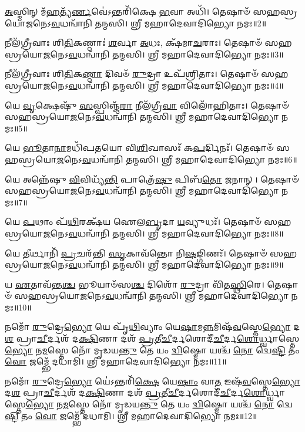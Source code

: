 \-\ul{𑌅}\-𑌸𑍍𑌮𑌿𑌨𑍍 𑌮᳴\-\ul{𑌹}\-𑌤𑍍𑌯᳴\-\ul{𑌰𑍍𑌣}\-𑌵𑍇॑𑌽𑌨𑍍𑌤𑌰𑌿᳴𑌕𑍍𑌷𑍇 \ul{𑌭}\-𑌵𑌾 𑌅𑌧𑌿᳴। 𑌤𑍇𑌷𑌾𑍞᳴ 𑌸𑌹𑌸𑍍𑌰𑌯𑍋\-\ul{𑌜}\-𑌨𑍇\-𑌽\-\ul{𑌵}\-𑌧𑌨𑍍𑌵𑌾᳴𑌨𑌿 𑌤𑌨𑍍𑌮𑌸𑌿। 𑌶𑍍𑌰𑍀 𑌮𑌹𑌾𑌦𑍇𑌵𑌾𑌦𑌿𑌭𑍍𑌯𑍋 𑌨𑌮𑌃॥2॥

𑌨𑍀𑌲᳴𑌗𑍍𑌰𑍀𑌵𑌾𑌃 𑌶𑌿\-\ul{𑌤𑌿}\-𑌕𑌣𑍍𑌠𑌾𑌃॑ \ul{𑌶}\-𑌰𑍍𑌵𑌾 \ul{𑌅}\-𑌧𑌃, 𑌕𑍍𑌷᳴𑌮𑌾\-\ul{𑌚}\-𑌰𑌾𑌃। 𑌤𑍇𑌷𑌾𑍞᳴ 𑌸𑌹𑌸𑍍𑌰𑌯𑍋\-\ul{𑌜}\-𑌨𑍇\-𑌽\-\ul{𑌵}\-𑌧𑌨𑍍𑌵𑌾᳴𑌨𑌿 𑌤𑌨𑍍𑌮𑌸𑌿। 𑌶𑍍𑌰𑍀 𑌮𑌹𑌾𑌦𑍇𑌵𑌾𑌦𑌿𑌭𑍍𑌯𑍋 𑌨𑌮𑌃॥3॥

𑌨𑍀𑌲᳴𑌗𑍍𑌰𑍀𑌵𑌾𑌃 𑌶𑌿\-\ul{𑌤𑌿}\-𑌕\-\ul{𑌣𑍍𑌠𑌾} 𑌦𑌿𑌵𑍞᳴ \ul{𑌰𑍁}\-𑌦𑍍𑌰𑌾 𑌉𑌪᳴𑌶𑍍𑌰𑌿𑌤𑌾𑌃। 𑌤𑍇𑌷𑌾𑍞᳴ 𑌸𑌹𑌸𑍍𑌰𑌯𑍋\-\ul{𑌜}\-𑌨𑍇\-𑌽\-\ul{𑌵}\-𑌧𑌨𑍍𑌵𑌾᳴𑌨𑌿 𑌤𑌨𑍍𑌮𑌸𑌿। 𑌶𑍍𑌰𑍀 𑌮𑌹𑌾𑌦𑍇𑌵𑌾𑌦𑌿𑌭𑍍𑌯𑍋 𑌨𑌮𑌃॥4॥

𑌯𑍇 \ul{𑌵𑍃}\-𑌕𑍍𑌷𑍇𑌷𑍁᳴ \ul{𑌸}\-𑌸𑍍𑌪𑌿𑌞𑍍𑌜᳴\-\ul{𑌰𑌾} 𑌨𑍀𑌲᳴𑌗𑍍𑌰𑍀\-\ul{𑌵𑌾} 𑌵𑌿𑌲𑍋᳴𑌹𑌿𑌤𑌾𑌃। 𑌤𑍇𑌷𑌾𑍞᳴ 𑌸𑌹𑌸𑍍𑌰𑌯𑍋\-\ul{𑌜}\-𑌨𑍇\-𑌽\-\ul{𑌵}\-𑌧𑌨𑍍𑌵𑌾᳴𑌨𑌿 𑌤𑌨𑍍𑌮𑌸𑌿। 𑌶𑍍𑌰𑍀 𑌮𑌹𑌾𑌦𑍇𑌵𑌾𑌦𑌿𑌭𑍍𑌯𑍋 𑌨𑌮𑌃॥5॥

𑌯𑍇 \ul{𑌭𑍂}\-𑌤𑌾\-\ul{𑌨𑌾}\-𑌮𑌧𑌿᳴𑌪𑌤𑌯𑍋 𑌵𑌿\-\ul{𑌶𑌿}\-𑌖𑌾𑌸𑌃᳴ 𑌕\-\ul{𑌪}\-𑌰𑍍𑌦𑌿𑌨𑌃᳴। 𑌤𑍇𑌷𑌾𑍞᳴ 𑌸𑌹𑌸𑍍𑌰𑌯𑍋\-\ul{𑌜}\-𑌨𑍇\-𑌽\-\ul{𑌵}\-𑌧𑌨𑍍𑌵𑌾᳴𑌨𑌿 𑌤𑌨𑍍𑌮𑌸𑌿। 𑌶𑍍𑌰𑍀 𑌮𑌹𑌾𑌦𑍇𑌵𑌾𑌦𑌿𑌭𑍍𑌯𑍋 𑌨𑌮𑌃॥6॥

𑌯𑍇 𑌅𑌨𑍍𑌨𑍇᳴𑌷𑍁 \ul{𑌵𑌿}\-𑌵𑌿𑌧𑍍𑌯᳴\-\ul{𑌨𑍍𑌤𑌿} 𑌪𑌾𑌤𑍍𑌰𑍇᳴\-\ul{𑌷𑍁} 𑌪𑌿𑌬᳴\-\ul{𑌤𑍋} 𑌜𑌨𑌾𑌨𑍍। 𑌤𑍇𑌷𑌾𑍞᳴ 𑌸𑌹𑌸𑍍𑌰𑌯𑍋\-\ul{𑌜}\-𑌨𑍇\-𑌽\-\ul{𑌵}\-𑌧𑌨𑍍𑌵𑌾᳴𑌨𑌿 𑌤𑌨𑍍𑌮𑌸𑌿। 𑌶𑍍𑌰𑍀 𑌮𑌹𑌾𑌦𑍇𑌵𑌾𑌦𑌿𑌭𑍍𑌯𑍋 𑌨𑌮𑌃॥7॥

𑌯𑍇 \ul{𑌪}\-𑌥𑌾𑌂 𑌪᳴\-\ul{𑌥𑌿}\-𑌰𑌕𑍍𑌷᳴𑌯 𑌐𑌲\-\ul{𑌬𑍃}\-𑌦𑌾 \ul{𑌯}\-𑌵𑍍𑌯𑍁𑌧𑌃᳴। 𑌤𑍇𑌷𑌾𑍞᳴ 𑌸𑌹𑌸𑍍𑌰𑌯𑍋\-\ul{𑌜}\-𑌨𑍇\-𑌽\-\ul{𑌵}\-𑌧𑌨𑍍𑌵𑌾᳴𑌨𑌿 𑌤𑌨𑍍𑌮𑌸𑌿। 𑌶𑍍𑌰𑍀 𑌮𑌹𑌾𑌦𑍇𑌵𑌾𑌦𑌿𑌭𑍍𑌯𑍋 𑌨𑌮𑌃॥8॥

𑌯𑍇 \ul{𑌤𑍀}\-𑌰𑍍𑌥𑌾𑌨𑌿᳴ \ul{𑌪𑍍𑌰}\-𑌚𑌰᳴𑌨𑍍𑌤𑌿 \ul{𑌸𑍃}\-𑌕𑌾𑌵᳴𑌨𑍍𑌤𑍋 𑌨𑌿\-\ul{𑌷}\-𑌙𑍍𑌗𑌿𑌣𑌃᳴। 𑌤𑍇𑌷𑌾𑍞᳴ 𑌸𑌹𑌸𑍍𑌰𑌯𑍋\-\ul{𑌜}\-𑌨𑍇\-𑌽\-\ul{𑌵}\-𑌧𑌨𑍍𑌵𑌾᳴𑌨𑌿 𑌤𑌨𑍍𑌮𑌸𑌿। 𑌶𑍍𑌰𑍀 𑌮𑌹𑌾𑌦𑍇𑌵𑌾𑌦𑌿𑌭𑍍𑌯𑍋 𑌨𑌮𑌃॥9॥

𑌯 \ul{𑌏}\-𑌤𑌾𑌵᳴𑌨𑍍𑌤\-\ul{𑌶𑍍𑌚} 𑌭𑍂𑌯𑌾𑍞᳴𑌸\-\ul{𑌶𑍍𑌚} 𑌦𑌿𑌶𑍋᳴ \ul{𑌰𑍁}\-𑌦𑍍𑌰𑌾 𑌵𑌿᳴𑌤\-\ul{𑌸𑍍𑌥𑌿}\-𑌰𑍇। 𑌤𑍇𑌷𑌾𑍞᳴ 𑌸𑌹𑌸𑍍𑌰𑌯𑍋\-\ul{𑌜}\-𑌨𑍇\-𑌽\-\ul{𑌵}\-𑌧𑌨𑍍𑌵𑌾᳴𑌨𑌿 𑌤𑌨𑍍𑌮𑌸𑌿। 𑌶𑍍𑌰𑍀 𑌮𑌹𑌾𑌦𑍇𑌵𑌾𑌦𑌿𑌭𑍍𑌯𑍋 𑌨𑌮𑌃॥10॥

𑌨𑌮𑍋᳴ \ul{𑌰𑍁}\-𑌦𑍍𑌰𑍇\-\ul{𑌭𑍍𑌯𑍋} 𑌯𑍇 𑌪𑍃᳴\-\ul{𑌥𑌿}\-𑌵𑍍𑌯𑌾𑌂 𑌯𑍇\-\ul{𑌷𑌾}\-𑌮\-\ul{𑌨𑍍𑌨}\-𑌮𑌿𑌷᳴\-\ul{𑌵}\-𑌸𑍍𑌤𑍇\-\ul{𑌭𑍍𑌯𑍋} 𑌦\-\ul{𑌶} 𑌪𑍍𑌰𑌾\-\ul{𑌚𑍀}\-𑌰𑍍𑌦𑌶᳴ 𑌦\-\ul{𑌕𑍍𑌷𑌿}\-𑌣𑌾 𑌦𑌶᳴ \ul{𑌪𑍍𑌰}\-𑌤𑍀\-\ul{𑌚𑍀}\-𑌰𑍍𑌦𑌶𑍋\-𑌦𑍀᳴\-\ul{𑌚𑍀}\-𑌰𑍍𑌦\-\ul{𑌶𑍋}\-𑌰𑍍𑌧𑍍𑌵𑌾𑌸𑍍𑌤𑍇\-\ul{𑌭𑍍𑌯𑍋} 𑌨\-\ul{𑌮}\-𑌸𑍍𑌤𑍇 𑌨𑍋᳴ 𑌮𑍃𑌡𑌯\-\ul{𑌨𑍍𑌤𑍁} 𑌤𑍇 𑌯𑌂 \ul{𑌦𑍍𑌵𑌿}\-𑌷𑍍𑌮𑍋 𑌯𑌶𑍍𑌚᳴ \ul{𑌨𑍋} 𑌦𑍍𑌵𑍇\-\ul{𑌷𑍍𑌟𑌿} 𑌤𑌂 \ul{𑌵𑍋} 𑌜𑌮𑍍𑌭𑍇᳴ 𑌦𑌧𑌾𑌮𑌿। 𑌶𑍍𑌰𑍀 𑌮𑌹𑌾𑌦𑍇𑌵𑌾𑌦𑌿𑌭𑍍𑌯𑍋 𑌨𑌮𑌃॥11॥ 

𑌨𑌮𑍋᳴ \ul{𑌰𑍁}\-𑌦𑍍𑌰𑍇\-\ul{𑌭𑍍𑌯𑍋} 𑌯𑍇॑𑌽𑌨𑍍𑌤𑌰𑌿᳴\-\ul{𑌕𑍍𑌷𑍇} 𑌯𑍇\-\ul{𑌷𑌾𑌂} 𑌵𑌾\-\ul{𑌤} 𑌇𑌷᳴\-\ul{𑌵}\-𑌸𑍍𑌤𑍇\-\ul{𑌭𑍍𑌯𑍋} 𑌦\-\ul{𑌶} 𑌪𑍍𑌰𑌾\-\ul{𑌚𑍀}\-𑌰𑍍𑌦𑌶᳴ 𑌦\-\ul{𑌕𑍍𑌷𑌿}\-𑌣𑌾 𑌦𑌶᳴ \ul{𑌪𑍍𑌰}\-𑌤𑍀\-\ul{𑌚𑍀}\-𑌰𑍍𑌦𑌶𑍋\-𑌦𑍀᳴\-\ul{𑌚𑍀}\-𑌰𑍍𑌦\-\ul{𑌶𑍋}\-𑌰𑍍𑌧𑍍𑌵𑌾𑌸𑍍𑌤𑍇\-\ul{𑌭𑍍𑌯𑍋} 𑌨\-\ul{𑌮}\-𑌸𑍍𑌤𑍇 𑌨𑍋᳴ 𑌮𑍃𑌡𑌯\-\ul{𑌨𑍍𑌤𑍁} 𑌤𑍇 𑌯𑌂 \ul{𑌦𑍍𑌵𑌿}\-𑌷𑍍𑌮𑍋 𑌯𑌶𑍍𑌚᳴ \ul{𑌨𑍋} 𑌦𑍍𑌵𑍇\-\ul{𑌷𑍍𑌟𑌿} 𑌤𑌂 \ul{𑌵𑍋} 𑌜𑌮𑍍𑌭𑍇᳴ 𑌦𑌧𑌾𑌮𑌿। 𑌶𑍍𑌰𑍀 𑌮𑌹𑌾𑌦𑍇𑌵𑌾𑌦𑌿𑌭𑍍𑌯𑍋 𑌨𑌮𑌃॥12॥ 


